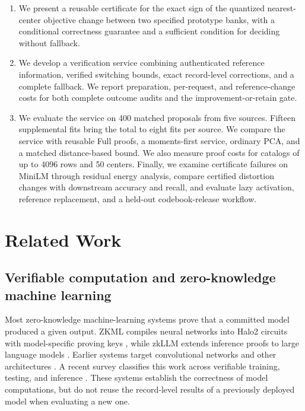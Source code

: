 \documentclass[5p,times,twocolumn]{elsarticle}
\begin{document}
\begin{enumerate}
    \item We present a reusable certificate for the exact sign of the
    quantized nearest-center objective change between two specified
    prototype banks, with a conditional correctness guarantee and a
    sufficient condition for deciding without fallback.

    \item We develop a verification service combining authenticated
    reference information, verified switching bounds, exact
    record-level corrections, and a complete fallback. We report
    preparation, per-request, and reference-change costs for both
    complete outcome audits and the improvement-or-retain gate.

\item We evaluate the service on 400 matched proposals from five sources. Fifteen supplemental fits bring the total to eight fits per source. We compare the service with reusable Full proofs, a moments-first service, ordinary PCA, and a matched distance-based bound. We also measure proof costs for catalogs of up to 4096 rows and 50 centers. Finally, we examine certificate failures on MiniLM through residual energy analysis, compare certified distortion changes with downstream accuracy and recall, and evaluate lazy activation, reference replacement, and a held-out codebook-release workflow.

\end{enumerate}

\section{Related Work}
\label{sec:related-work}

\subsection{Verifiable computation and zero-knowledge machine learning}
\label{sec:rw-zkml}

Most zero-knowledge machine-learning systems prove that a committed
model produced a given output. ZKML compiles neural networks into
Halo2 circuits with model-specific proving keys
\cite{chen2024zkml}, while zkLLM extends inference proofs to large
language models \cite{sun2024zkllm}. Earlier systems target
convolutional networks and other architectures
\cite{zkcnn2021,feng2021zen,weng2021mystique}. A recent survey
classifies this work across verifiable training, testing, and
inference \cite{peng2025zkmlsurvey}. These systems establish the
correctness of model computations, but do not reuse the
record-level results of a previously deployed model when evaluating
a new one.
\end{document}
